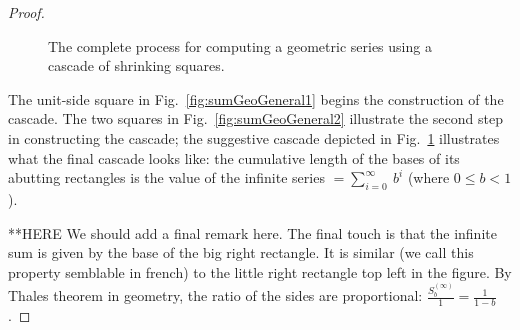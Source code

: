 \begin{proof}
\begin{figure}[ht]
\begin{center}
\caption{The complete process for computing a geometric series using a
  cascade of shrinking squares.}
       \label{fig:sumGeoGeneral3}
\end{center}
\end{figure}
The unit-side square in Fig.~\ref{fig:sumGeoGeneral1} begins the
construction of the cascade.  The two squares in
Fig.~\ref{fig:sumGeoGeneral2} illustrate the second step in
constructing the cascade; the suggestive cascade depicted in
Fig.~\ref{fig:sumGeoGeneral3} illustrates what the final cascade looks
like: the cumulative length of the bases of its abutting rectangles is
the value of the infinite series $=
\sum_{i=0}^\infty \ b^{i}$ (where $0 \leq b < 1$).

**HERE
{\Denis We should add a final remark here}.
The final touch is that the infinite sum is given by the base of the big right rectangle.
It is similar ({\Denis we call this property semblable in french}) to the little right rectangle top left in the figure.
By Thales theorem in geometry, the ratio of the sides are proportional:
$\frac{S^{(\infty)}_{b} }{1} = \frac{1}{1-b}$. 
\end{proof}

\medskip


